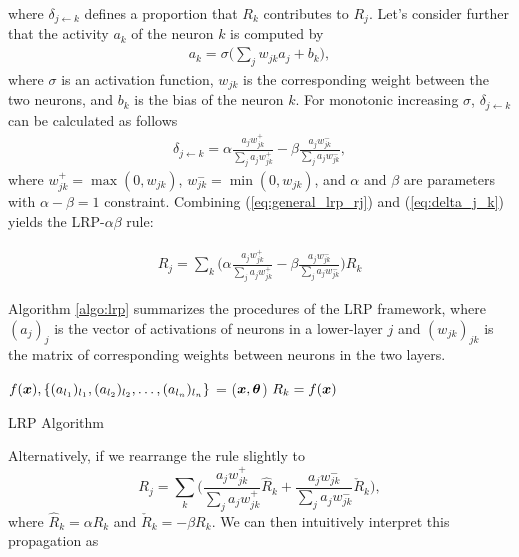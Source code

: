 where $\delta_{j\leftarrow k}$ defines a proportion that  $R_{k}$ contributes to $R_j$. Let's consider further that the activity $a_k$ of the neuron $k$ is computed by 
\begin{align*}
	a_k = \sigma \bigg( \sum_{j} w_{jk} a_j + b_k \bigg),
\end{align*}
where $\sigma$ is an activation function, $w_{jk}$ is the corresponding weight between the two neurons, and $b_k$ is the bias of the neuron $k$. For monotonic increasing $\sigma$, $\delta_{j\leftarrow k}$ can be calculated as follows 
\begin{align} \label{eq:delta_j_k}
	\delta_{j\leftarrow k} = \alpha\frac{a_j w_{jk}^+}{\sum_{j} a_jw_{jk}^+} - \beta\frac{a_j w_{jk}^-}{\sum_{j} a_jw_{jk}^-},
\end{align}
where $w_{jk}^+ = \max(0, w_{jk})$, $w_{jk}^- = \min(0, w_{jk})$, and $\alpha$ and $\beta$ are parameters with $\alpha-\beta = 1$ constraint. Combining (\ref{eq:general_lrp_rj}) and (\ref{eq:delta_j_k}) yields the LRP-$\alpha\beta$ rule:

\begin{align*}
	R_j = \sum_{k} 	\bigg( \alpha\frac{a_j w_{jk}^+}{\sum_{j} a_jw_{jk}^+} - \beta\frac{a_j w_{jk}^-}{\sum_{j} a_jw_{jk}^-} \bigg )  R_{k}
\end{align*}

Algorithm \ref{algo:lrp} summarizes the procedures of the LRP framework, where $(a_j)_j$ is the vector of activations of neurons in a lower-layer $j$ and $(w_{jk})_{jk}$ is the matrix of corresponding weights between neurons in the two layers.

\begin{algorithm}[H]
$f(\patvector{x}), \{ (a_{l_1})_{l_1}, (a_{l_2})_{l_2}, \dots, (a_{l_n})_{l_n}\}$ = ($\patvector{x}, \patvector{\theta}$)\;
$R_k = f(\patvector{x})$\;
 \caption{LRP Algorithm}
 \label{algo:lrp}
\end{algorithm}

Alternatively, if we rearrange the rule slightly to 
$$
	R_j = \sum_{k} \bigg( \frac{a_j w_{jk}^+}{\sum_{j} a_jw_{jk}^+} \hat{R}_{k} + \frac{a_j w_{jk}^-}{\sum_{j} a_jw_{jk}^-} \check{R}_{k} \bigg),
$$ 
where $\hat{R}_{k}  = \alpha R_{k}$ and  $\check{R}_{k} = -\beta R_{k} $. We can then intuitively interpret this propagation as 

